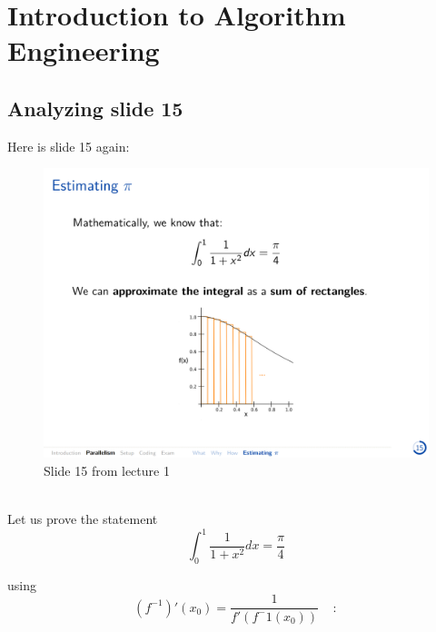 \documentclass[../../main.tex]{subfiles}
\begin{document}
\section{Introduction to Algorithm Engineering}
\subsection{Analyzing slide 15}
Here is slide 15 again:

\begin{figure}[h]
    \includegraphics[width=\textwidth]{page_15.png}
    \caption{Slide 15 from lecture 1}
\end{figure}

~\\
Let us prove the statement
\[
    \int_{0}^{1}\frac{1}{1+x^2} dx = \frac{\pi}{4}
\]

\noindent using
\[
    (f^{-1})'(x_0) = \frac{1}{f'(f^-1(x_0))} \ \ \ \ \ :
\]
\end{document}
